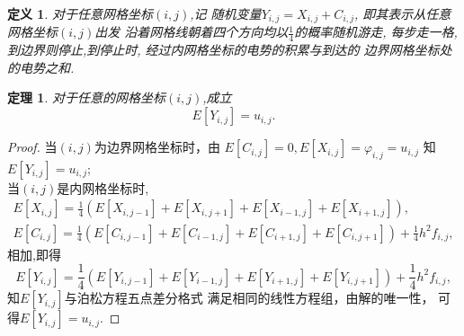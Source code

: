 \documentclass[UTF8,a4paper,notitlepage]{ctexart}%
\newtheorem{definition}{定义}
\newtheorem{thm}{定理}[section]
\theoremstyle{nonumberplain}
\newtheorem{proof}{证明}%
\begin{document}
\begin{definition}
    对于任意网格坐标$(i,j)$,记
    随机变量$Y_{i,j}=X_{i,j}+C_{i,j}$,
    即其表示从任意网格坐标$(i,j)$出发
    沿着网格线朝着四个方向均以$\frac{1}{4}$的概率随机游走,
    每步走一格,
    到边界则停止,到停止时,
    经过内网格坐标的电势的积累与到达的
    边界网格坐标处的电势之和.
\end{definition}
\begin{thm}
    对于任意的网格坐标$(i,j)$,成立
    \begin{equation}
E[Y_{i,j}]=u_{i,j}.\nonumber
    \end{equation}
\end{thm}
\begin{proof}
当$(i,j)$为边界网格坐标时，由
$E[C_{i,j}]=0,E[X_{i,j}]=\varphi _{i,j}=u_{i,j}$
知$E[Y_{i,j}]=u_{i,j}$;\\
当$(i,j)$是内网格坐标时,
\begin{gather}
    E[X_{i,j}]=\frac{1}{4}(
        E[X_{i,j-1}]+E[X_{i,j+1}]+
        E[X_{i-1,j}]+E[X_{i+1,j}]),\nonumber\\
        E[C_{i,j}]=\frac{1}{4}
        (E[C_{i,j-1}]+E[C_{i-1,j}]+
        E[C_{i+1,j}]+E[C_{i,j+1}])+\frac{1}{4}h^2f_{i,j} ,\nonumber 
\end{gather}
相加,即得
\begin{equation}
    E[Y_{i,j}]=
\frac{1}{4}
(E[Y_{i,j-1}]+E[Y_{i-1,j}]+
E[Y_{i+1,j}]+E[Y_{i,j+1}])+\frac{1}{4}h^2f_{i,j} ,\nonumber 
\end{equation}
知$E[Y_{i,j}]$与泊松方程五点差分格式
满足相同的线性方程组，由解的唯一性，
可得$E[Y_{i,j}]=u_{i,j}.$
\end{proof}
\end{document}
